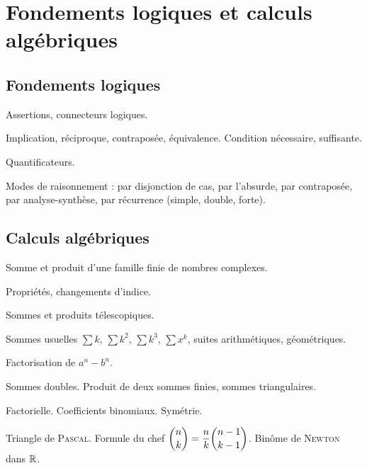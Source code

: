 \documentclass[a4paper,french,bookmarks]{book}
\begin{document}
    \cleardoublepage
    \def\khdate{du 20 au 24 septembre 2021}
    \chapter{Fondements logiques et calculs algébriques}

    \section*{Fondements logiques}
    
    \begin{enumerate}
        \ithand Assertions, connecteurs logiques.
        
        \ithand Implication, réciproque, contraposée, équivalence. Condition
        nécessaire, suffisante.
        
        \ithand Quantificateurs.
        
        \ithand Modes de raisonnement : par disjonction de cas, par l'absurde, par
        contraposée, par analyse-synthèse, par récurrence (simple, double, forte).
    \end{enumerate}
    
    \section*{Calculs algébriques}
    
    \begin{enumerate}
        \ithand Somme et produit d'une famille finie de nombres complexes.
        
        \ithand Propriétés, changements d'indice.
        
        \ithand Sommes et produits télescopiques.
        
        \ithand Sommes usuelles $\displaystyle\sum k$, $\displaystyle\sum k^2$,
        $\displaystyle\sum k^3$, $\displaystyle\sum x^k$, suites arithmétiques,
        géométriques.
        
        \ithand Factorisation de $a^n - b^n$.
        
        \ithand Sommes doubles. Produit de deux sommes finies, sommes triangulaires.
        
        \ithand Factorielle. Coefficients binomiaux. Symétrie.
        
        \ithand Triangle de \textsc{Pascal}. Formule du chef  $\dbinom{n}{k} =
        \dfrac{n}{k}\dbinom{n-1}{k-1}$. Binôme de \textsc{Newton} dans $\mathbb{R}$.
    \end{enumerate}
    
\end{document}
